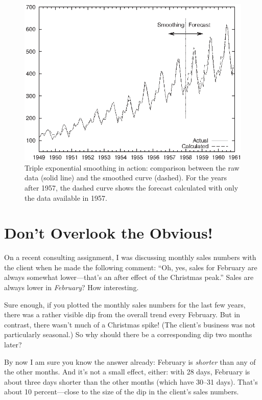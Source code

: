 \begin{figure}
  \centerline{\includegraphics{img/airtraffic}}
  \caption{Triple exponential smoothing in action: comparison between
    the raw data (solid line) and the smoothed curve (dashed). For the
    years after 1957, the dashed curve shows the forecast calculated
    with only the data available in 1957.}
  \label{fig:airtraffic}
\end{figure}


\section{Don't Overlook the Obvious!}

On a recent consulting assignment, I was discussing monthly sales
numbers with the client when he made the following comment: ``Oh,
yes, sales for February are always somewhat lower---that's an
after effect of the Christmas peak.'' Sales are always lower in
\emph{February}? How interesting.

Sure enough, if you plotted the monthly sales numbers for the last few
years, there was a rather visible dip from the overall trend every
February. But in contrast, there wasn't much of a Christmas spike!
(The client's business was not particularly seasonal.) So why should
there be a corresponding dip two months later?

By now I am sure you know the answer already: February is
\emph{shorter} than any of the other months. And it's not a small
effect, either: with 28 days, February is about three days shorter than
the other months (which have 30--31 days). That's about 10
percent---close to the size of the dip in the client's sales numbers.

